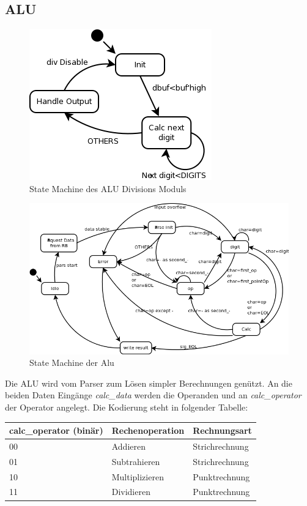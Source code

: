 \subsection{ALU}

\begin{figure}[!ht]
 \centering
 \includegraphics[scale=0.55]{pics/alu_div.png}
 \caption{State Machine des ALU Divisions Moduls}
 \label{fig:alu_div_module}
\end{figure}

\begin{figure}[!ht]
 \centering
 \includegraphics[scale=0.55]{pics/alu.png}
 \caption{State Machine der Alu}
 \label{fig:alu_module}
\end{figure}

Die ALU wird vom Parser zum Lösen simpler Berechnungen genützt. An die beiden Daten Eingänge \textit{calc\_data} werden die Operanden
und an \textit{calc\_operator} der Operator angelegt. Die Kodierung steht in folgender Tabelle:

\begin{center}
\begin{tabular}[!ht]{|l|l|l|}
\hline calc\_operator (binär) & Rechenoperation & Rechnungsart\\ 
	\hline
	00 & Addieren & Strichrechnung\\ 
	01 & Subtrahieren & Strichrechnung\\ 
	10 & Multiplizieren & Punktrechnung\\ 
	11 & Dividieren & Punktrechnung\\
 \hline
\end{tabular}
\end{center}

